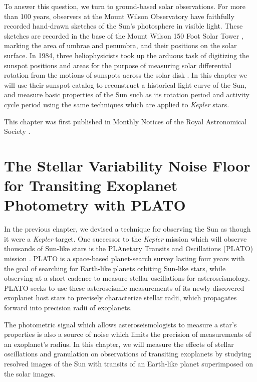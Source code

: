 \documentclass[12pt, twoside]{uwthesis}
\newcommand{\kepler}{\textsl{Kepler}\xspace}
\begin{document}
To answer this question, we turn to ground-based solar observations. For more than 100 years, observers at the Mount Wilson Observatory have faithfully recorded hand-drawn sketches of the Sun's photosphere in visible light. These sketches are recorded in the base of the Mount Wilson 150 Foot Solar Tower \citep{Hale1912,vanMaanen1917}, marking the area of umbrae and penumbra, and their positions on the solar surface. In 1984, three heliophysicists took up the arduous task of digitizing the sunspot positions and areas for the purpose of measuring solar differential rotation from the motions of sunspots across the solar disk \citep{Howard1984}. In this chapter we will use their sunspot catalog to reconstruct a historical light curve of the Sun, and measure basic properties of the Sun such as its rotation period and activity cycle period using the same techniques which are applied to \kepler stars.  

This chapter was first published in Monthly Notices of the Royal Astronomical Society \citep{Morris2019a}. 



\chapter{The Stellar Variability Noise Floor for Transiting Exoplanet Photometry with PLATO} \label{chap:plato}

In the previous chapter, we devised a technique for observing the Sun as though it were a \kepler target. One successor to the \kepler mission which will observe thousands of Sun-like stars is the PLAnetary Transits and Oscillations (PLATO) mission \citep{Rauer2014}. PLATO is a space-based planet-search survey lasting four years with the goal of searching for Earth-like planets orbiting Sun-like stars, while observing at a short cadence to measure stellar oscillations for asteroseismology. PLATO seeks to use these asteroseismic measurements of its newly-discovered exoplanet host stars to precisely characterize stellar radii, which propagates forward into precision radii of exoplanets.

The photometric signal which allows asteroseismologists to measure a star's properties is also a source of noise which limits the precision of measurements of an exoplanet's radius. In this chapter, we will measure the effects of stellar oscillations and granulation on observations of transiting exoplanets by studying resolved images of the Sun with transits of an Earth-like planet superimposed on the solar images.  
\end{document}
